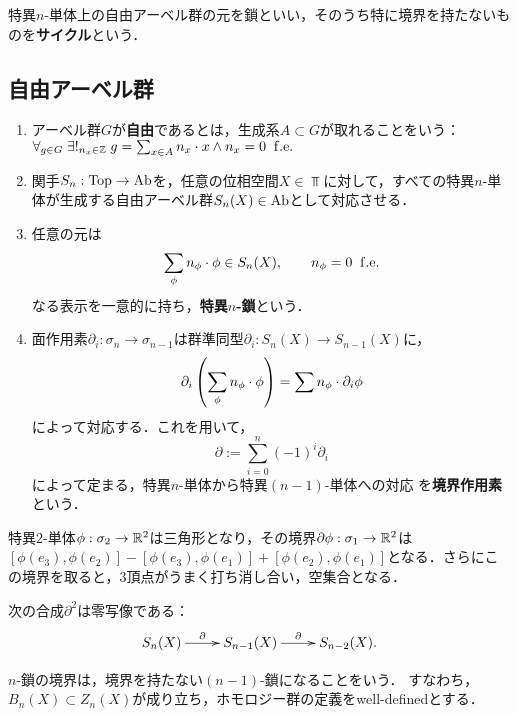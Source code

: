 \documentclass[uplatex,dvipdfmx]{jsreport}
\begin{document}
\begin{tcolorbox}[colframe=ForestGreen, colback=ForestGreen!10!white,breakable,colbacktitle=ForestGreen!40!white,coltitle=black,fonttitle=\bfseries\sffamily,
title=]
    特異$n$-単体上の自由アーベル群の元を鎖といい，そのうち特に境界を持たないものを\textbf{サイクル}という．
\end{tcolorbox}

\subsection{自由アーベル群}

\begin{definition}\mbox{}
    \begin{enumerate}
        \item アーベル群$G$が\textbf{自由}であるとは，生成系$A\subset G$が取れることをいう：$\forall_{g\in G}\;\exists!_{n_x\in\mathbb{Z}}\;g=\sum_{x\in A}n_x\cdot x\land n_x=0\;\;\mathrm{f.e.}$
        \item 関手$S_n:\mathrm{Top}\to\mathrm{Ab}$を，任意の位相空間$X\in\Top$に対して，すべての特異$n$-単体が生成する自由アーベル群$S_n(X)\in\mathrm{Ab}$として対応させる．
        \item 任意の元は
        \[\sum_{\phi}n_\phi\cdot\phi\in S_n(X),\qquad n_\phi=0\;\;\mathrm{f.e.}\]
        なる表示を一意的に持ち，\textbf{特異$n$-鎖}という．
        \item 面作用素$\partial_i:\sigma_n\to\sigma_{n-1}$は群準同型$\partial_i:S_n(X)\to S_{n-1}(X)$に，
        \[\partial_i\left(\sum_\phi n_\phi\cdot\phi\right)=\sum n_\phi\cdot\partial_i\phi\]
        によって対応する．これを用いて，
        \[\partial:=\sum^n_{i=0}(-1)^i\partial_i\]
        によって定まる，特異$n$-単体から特異$(n-1)$-単体への対応
        を\textbf{境界作用素}という．
    \end{enumerate}
\end{definition}

\begin{example}[特異$2$-単体]
    特異$2$-単体$\phi:\sigma_2\to\mathbb{R}^2$は三角形となり，その境界$\partial\phi:\sigma_1\to\mathbb{R}^2$は
    $[\phi(e_3),\phi(e_2)]-[\phi(e_3),\phi(e_1)]+[\phi(e_2),\phi(e_1)]$となる．さらにこの境界を取ると，3頂点がうまく打ち消し合い，空集合となる．
\end{example}

\begin{proposition}
    次の合成$\partial^2$は零写像である：
    \[\xymatrix@R-1pc{
        S_n(X)\ar[r]^-{\partial}&S_{n-1}(X)\ar[r]^-{\partial}&S_{n-2}(X).
    }\]
\end{proposition}
\begin{remarks}
    $n$-鎖の境界は，境界を持たない$(n-1)$-鎖になることをいう．
    すなわち，$B_n(X)\subset Z_n(X)$が成り立ち，ホモロジー群の定義をwell-definedとする．
\end{remarks}
\end{document}
